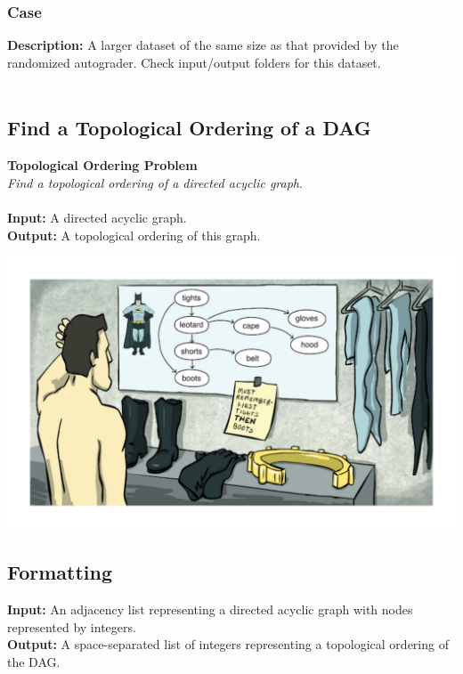 \documentclass{article}
\begin{document}
\subsubsection*{Case }
\hline \vspace{5}
\textbf{Description:} A larger dataset of the same size as that provided by the randomized autograder. Check input/output folders for this dataset.\\ \\
\pagebreak

\subsection{Find a Topological Ordering of a DAG}
\hline\vspace{5}
\textbf{Topological Ordering Problem}\\
\emph{Find a topological ordering of a directed acyclic graph}.\\ \\
\textbf{Input:} A directed acyclic graph.\\
\textbf{Output:} A topological ordering of this graph.
\begin{center}
    \includegraphics[scale=0.2]{c5/logos/5N.png}
\end{center}
\hline\vspace{5}

\subsection*{Formatting}
\noindent\textbf{Input:} An adjacency list representing a directed acyclic graph with nodes represented by integers.\\
\noindent\textbf{Output:} A space-separated list of integers representing a topological ordering of the DAG.
\end{document}

